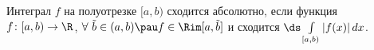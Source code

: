 
   Интеграл $f$ на полуотрезке $[a,b)$ сходится абсолютно, если функция ${f\colon[a,b)\to\R}$, $\forall\ \tilde b\in(a,b)\pau f\in\Rim[a,\tilde b]$  и сходится
   $\ds\int\limits_{[a,b)}|f(x)|\,dx$.
   